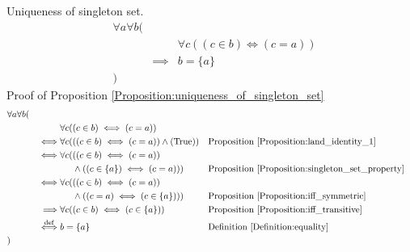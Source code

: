 \begin{prop}
\label{Proposition:uniqueness_of_singleton_set}
Uniqueness of singleton set.
\begin{align*}
& \forall a \forall b ( \\
& & & \forall c ((c \in b) \iff (c = a)) \\
& & \implies & b = \{ a \} \\
& )
\end{align*}
Proof of Proposition \ref{Proposition:uniqueness_of_singleton_set}
\begin{align*}
& \forall a \forall b ( \\
& & & \forall c ((c \in b) \iff (c = a)) \\
& & \iff & \forall c (((c \in b) \iff (c = a)) \land (\text{True}))
& & \text{Proposition \ref{Proposition:land_identity_1}} \\
& & \iff & \forall c (((c \in b) \iff (c = a)) \\
& & & \phantom{\forall c (} \land ((c \in \{ a \}) \iff (c = a)))
& & \text{Proposition \ref{Proposition:singleton_set_property}} \\
& & \iff & \forall c (((c \in b) \iff (c = a)) \\
& & & \phantom{\forall c (} \land ((c = a) \iff (c \in \{ a \})))
& & \text{Proposition \ref{Proposition:iff_symmetric}} \\
& & \implies & \forall c ((c \in b) \iff (c \in \{ a \}))
& & \text{Proposition \ref{Proposition:iff_transitive}} \\
& & \overset{\operatorname{def}}{\iff} & b = \{ a \}
& & \text{Definition \ref{Definition:equality}} \\
& )
\end{align*}
\end{prop}


